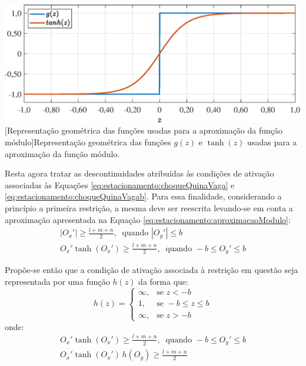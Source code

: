 \noindent	
\begin{minipage}{\textwidth}
	\vspace{\onelineskip}
	\centering
	\includegraphics[scale=0.58]{fig/resultados/estacionamento/obs/apxMod}
	[Representação geométrica das funções usadas para a aproximação da função módulo]{Representação geométrica das funções $ g(z) $ e $ \tanh(z) $ usadas para a aproximação da função módulo.}
	\label{fig:estacionamento:aproximacaoModulo}
	\vspace{\onelineskip}
\end{minipage}

Resta agora tratar as descontinuidades atribuídas às condições de ativação associadas às Equações \eqref{eq:estacionamento:choqueQuinaVaga} e \eqref{eq:estacionamento:choqueQuinaVagab}. Para essa finalidade, considerando a princípio a primeira restrição, a mesma deve ser reescrita levando-se em conta a aproximação apresentada na Equação \eqref{eq:estacionamento:aproximacaoModulo}:
%
\begin{gather}
|O_x'| \geq \frac{l + m + n}{2}, \;\; \text{quando } |O_y'| \leq b \\ 
O_x' \tanh(O_x') \geq \frac{l + m + n}{2}, \;\; \text{quando } -b \leq O_y' \leq b
\end{gather}

Propõe-se então que a condição de ativação associada à restrição em questão seja representada por uma função $ h(z) $ da forma que:
%
\begin{equation}
	h(z) = \begin{cases} \infty, & \mbox{se } z < -b \\ 1, & \mbox{se } -b \leq z \leq b \\  \infty, & \mbox{se } z > -b \end{cases}
\end{equation}
% 
onde:
\begin{gather}
\label{eq:estacionamento:restricaoBandPass}
O_x' \tanh(O_x') \geq \frac{l + m + n}{2}, \;\; \text{quando } -b \leq O_y' \leq b \\
\label{eq:estacionamento:restricaoBandPassb}
O_x' \tanh(O_x') \, h(O_y) \geq \frac{l + m + n}{2}
\end{gather}

